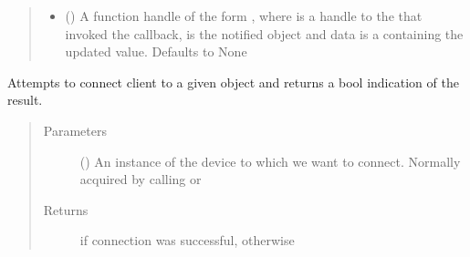 \documentclass[letterpaper,10pt,english]{sphinxmanual}
\begin{document}
\begin{fulllineitems}
\begin{quote}
\begin{description}
\begin{itemize}
\item {} 
 (\sphinxstyleliteralemphasis{\sphinxupquote{, }}) \textendash{} A function handle of the form , where  is a handle to the {\hyperref[\detokenize{simpleble:simpleble.SimpleBleClient}]{}} that invoked the callback,  is the notified  object and data is a  containing the updated value. Defaults to None

\end{itemize}

\end{description}\end{quote}

\begin{fulllineitems}
\label{\detokenize{simpleble:simpleble.SimpleBleClient.connect}}
Attempts to connect client to a given {\hyperref[\detokenize{simpleble:simpleble.SimpleBleDevice}]{}} object and returns a bool indication of the result.
\begin{quote}\begin{description}
\item[{Parameters}] \leavevmode
{} ({\hyperref[\detokenize{simpleble:simpleble.SimpleBleDevice}]{}}) \textendash{} An instance of the device to which we want to connect. Normally acquired by calling {\hyperref[\detokenize{simpleble:simpleble.SimpleBleClient.scan}]{}} or {\hyperref[\detokenize{simpleble:simpleble.SimpleBleClient.searchDevice}]{}}

\item[{Returns}] \leavevmode
{} if connection was successful,  otherwise


\end{description}
\end{quote}
\end{fulllineitems}
\end{fulllineitems}
\end{document}
